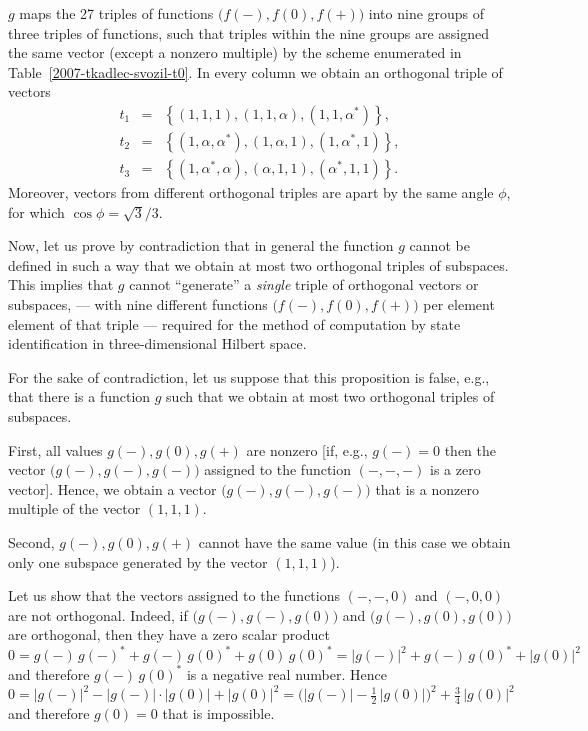 \documentclass{article}
\begin{document}
$g$ maps the 27 triples of functions $\bigl( f(-), f(0), f(+) \bigr)$ into nine groups of three triples of functions,
such that triples within the nine groups are assigned the same vector (except a nonzero multiple)
by the scheme enumerated
in Table~\ref{2007-tkadlec-svozil-t0}.
In every column we obtain an orthogonal triple of vectors
$$
\begin {array}{rcl}
t_1&=&\left\{(1,1,1),(1,1,\alpha),(1,1,\alpha^\ast )\right\}, \\
t_2&=&\left\{(1,\alpha,\alpha^\ast ),(1,\alpha,1), (1,\alpha^\ast ,1)\right\},\\
t_3&=&\left\{(1,\alpha^\ast ,\alpha),(\alpha,1,1),(\alpha^\ast ,1,1) \right\}.
\end {array}
$$
Moreover,
vectors from different orthogonal triples are apart by the same angle $\phi$, for which
$\cos \phi = \sqrt3/3$.



Now, let us prove by contradiction that in general the function $g$ cannot be defined
in such a way that we obtain at most two orthogonal triples of subspaces.
This implies that $g$ cannot ``generate'' a {\em single} triple of orthogonal vectors or subspaces,
--- with nine different functions $\bigl( f(-), f(0), f(+) \bigr)$ per element element of that triple ---
required for the method of computation by state identification in three-dimensional Hilbert space.

For the sake of contradiction, let us suppose that this proposition is
false, e.g., that there is a function $g$ such that we obtain at most two
orthogonal triples of subspaces.


First, all values $g(-), g(0), g(+)$ are nonzero [if, e.g., $g(-) = 0$
then the vector $\bigl(g(-),g(-),g(-)\bigr)$ assigned to the function
$(-,-,-)$ is a zero vector]. Hence, we obtain a vector
$\bigl(g(-),g(-),g(-)\bigr)$ that is a nonzero multiple of the vector
$(1,1,1)$.


Second, $g(-), g(0), g(+)$ cannot have the same value (in this case we
obtain only one subspace generated by the vector $(1,1,1)$).


Let us show that the vectors assigned to the functions $(-,-,0)$ and
$(-,0,0)$ are not orthogonal. Indeed, if $\bigl(g(-),g(-),g(0)\bigr)$ and
$\bigl(g(-),g(0),g(0)\bigr)$ are orthogonal, then they have a zero scalar
product $0 = g(-) \,  {g(-)}^\ast + g(-) \,  {g(0)}^\ast + g(0) \,
{g(0)}^\ast = |g(-)|^2 + g(-) \,  {g(0)}^\ast + |g(0)|^2$ and
therefore $g(-) \, {g(0)}^\ast$ is a negative real number. Hence $0 =
|g(-)|^2 - |g(-)| \cdot |g(0)| + |g(0)|^2 = \bigl( |g(-)| - \frac 12 \,
|g(0)| \bigr)^2 + \frac 34 \, |g(0)|^2$ and therefore $g(0) = 0$ that is
impossible.
\end{document}
